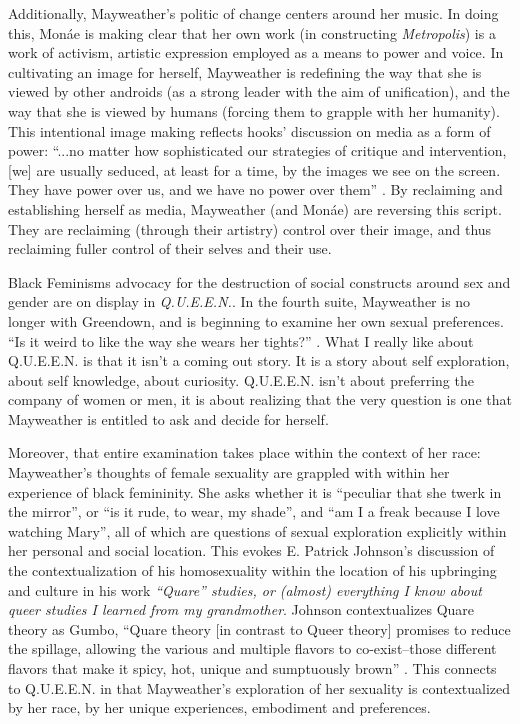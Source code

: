 \documentclass[a4paper, 11pt]{article} %
\begin{document}
Additionally, Mayweather's politic of change centers around her music.
In doing this, Mon\'ae is making clear that her own work (in constructing \emph{Metropolis}) is a work of activism, artistic expression employed as a means to power and voice.
In cultivating an image for herself, Mayweather is redefining the way that she is viewed by other androids (as a strong leader with the aim of unification), and the way that she is viewed by humans (forcing them to grapple with her humanity).
This intentional image making reflects hooks' discussion on media as a form of power: ``...no matter how sophisticated our strategies of critique and intervention, [we] are usually seduced, at least for a time, by the images we see on the screen. They have power over us, and we have no power over them'' \cite{hooksreeltoreal}.
By reclaiming and establishing herself as media, Mayweather (and Mon\'ae) are reversing this script.
They are reclaiming (through their artistry) control over their image, and thus reclaiming fuller control of their selves and their use.

Black Feminisms advocacy for the destruction of social constructs around sex and gender are on display in \emph{Q.U.E.E.N.}.
In the fourth suite, Mayweather is no longer with Greendown, and is beginning to examine her own sexual preferences.
``Is it weird to like the way she wears her tights?'' \cite{queen}.
What I really like about Q.U.E.E.N. is that it isn't a coming out story.
It is a story about self exploration, about self knowledge, about curiosity. 
Q.U.E.E.N. isn't about preferring the company of women or men, it is about realizing that the very question is one that Mayweather is entitled to ask and decide for herself.

Moreover, that entire examination takes place within the context of her race: Mayweather's thoughts of female sexuality are grappled with within her experience of black femininity.
She asks whether it is ``peculiar that she twerk in the mirror'', or ``is it rude, to wear, my shade'', and ``am I a freak because I love watching Mary'', all of which are questions of sexual exploration explicitly within her personal and social location.
This evokes E. Patrick Johnson's discussion of the contextualization of his homosexuality within the location of his upbringing and culture in his work \emph{``Quare'' studies, or (almost) everything I know about queer studies I learned from my grandmother}.
Johnson contextualizes Quare theory as Gumbo, 
``Quare theory [in contrast to Queer theory] promises to  reduce the spillage, allowing the various and multiple flavors to co-exist--those different flavors that make it spicy, hot, unique and sumptuously brown'' \cite{johnson2001quare}.
This connects to Q.U.E.E.N. in that Mayweather's exploration of her sexuality is contextualized by her race, by her unique experiences, embodiment and preferences. 
\end{document}
